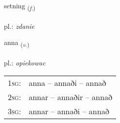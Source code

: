 \documentclass[frontgrid, backgrid]{flacards}\usepackage[]{graphicx}\usepackage[]{xcolor}
\begin{document}
\renewcommand{\flhead}{\vskip5pt \fboxsep=0pt {\small\bfseries\footnotesize Nafnorð | Noun}}
\renewcommand{\fcfoot}{\vskip5pt \fboxsep=0pt \hspace{2pt}{\small\bfseries\footnotesize 2K}}

\renewcommand{\blhead}{\vskip5pt {\small\bfseries\footnotesize Nafnorð | Noun }}
\renewcommand{\bcfoot}{\vskip5pt \hspace{2pt}{\small\bfseries\footnotesize 2K}}


{setning \small{\textsubscript{(\textit{f.})}} \\[1ex] %
\textphonetic{[sɛhtniŋk]} \\
pl.: \emph{zdanie} \\  [2ex]
\renewcommand*{\arraystretch}{0.8}
}

\renewcommand{\flhead}{\vskip5pt \fboxsep=0pt {\small\bfseries\footnotesize Sagnorð | Verb}}
\renewcommand{\fcfoot}{\vskip5pt \fboxsep=0pt \hspace{2pt}{\small\bfseries\footnotesize 2K}}

\renewcommand{\blhead}{\vskip5pt {\small\bfseries\footnotesize Sagnorð | Verb }}
\renewcommand{\bcfoot}{\vskip5pt \hspace{2pt}{\small\bfseries\footnotesize 2K}}


{anna \small{\textsubscript{(\textit{v.})}} \\[1ex] %
\textphonetic{[ana]} \\
pl.: \emph{opiekowac} \\  [2ex]
\renewcommand*{\arraystretch}{0.8}
\begin{tabular}{p{1cm}l}
\textsc{1sg}: & anna -- annaði -- annað \\ 
\textsc{2sg}: & annar -- annaðir -- annað \\ 
\textsc{3sg}: & annar -- annaði -- annað \\ 
\end{tabular}
}
\end{document}
